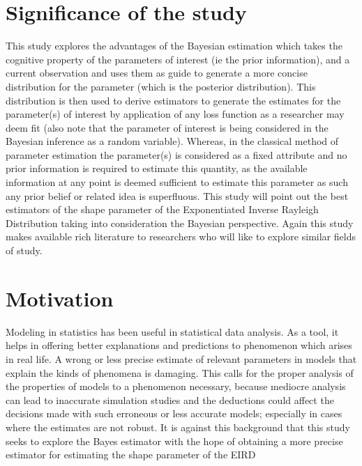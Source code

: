 \documentclass[a4paper,12pt]{report}
\newcommand{\para}{\hspace{0.5cm}}
\begin{document}
\section{Significance of the study}
\noindent\para This study explores the advantages of the Bayesian estimation which takes the cognitive property of the parameters of interest (ie the prior information), and a current observation and uses them as guide to generate a more concise distribution for the parameter (which is the posterior distribution). This distribution is then used to derive estimators to generate the estimates for the parameter(s) of interest by application of any loss function as a researcher may deem fit (also note that the parameter of interest is being considered in the Bayesian inference as a random variable). Whereas, in the classical method of parameter estimation the parameter(s) is considered as a fixed attribute and no prior information is required to estimate this quantity, as the available information at any point is deemed sufficient to estimate this parameter as such any prior belief or related idea is superfluous. This study will point out the best estimators of the shape parameter of the Exponentiated Inverse Rayleigh Distribution taking into consideration the Bayesian perspective. Again this study makes available rich literature to researchers who will like to explore similar fields of study.

\section{Motivation}
\noindent\para Modeling in statistics has been useful in statistical data analysis. As a tool, it helps in offering better explanations and predictions to phenomenon which arises in real life. A wrong or less precise estimate of relevant parameters in models that explain the kinds of phenomena is damaging. This calls for the proper analysis of the properties of models to a phenomenon necessary, because mediocre analysis can lead to inaccurate simulation studies and the deductions could affect the decisions made with such erroneous or less accurate models; especially in cases where the estimates are not robust. It is against this background that this study seeks to explore the Bayes estimator with the hope of obtaining a more precise estimator for estimating the shape parameter of the EIRD
\end{document}
